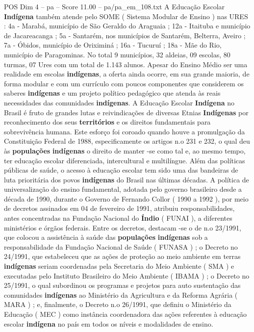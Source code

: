 \begin{textsample}{POS Dim 4 – pa – Score 11.00 – pa/pa\_em\_108.txt}
A Educação Escolar \textbf{Indígena} também atende pelo SOME ( Sistema Modular de Ensino ) nas URES : 4a - Marabá, município de São Geraldo do Araguaia ; 12a - Itaituba e município de Jacareacanga ; 5a - Santarém, nos municípios de Santarém, Belterra, Aveiro ; 7a - Óbidos, município de Oriximiná ; 16a - Tucuruí ; 18a - Mãe do Rio, município de Paragominas.
No total 9 municípios, 32 aldeias, 09 escolas, 80 turmas, 07 Ures com um total de 1.143 alunos.
Apesar do Ensino Médio ser uma realidade em escolas \textbf{indígenas}, a oferta ainda ocorre, em sua grande maioria, de forma modular e com um currículo com poucos componentes que considerem os saberes \textbf{indígenas} e um projeto político pedagógico que atenda às reais necessidades das comunidades \textbf{indígenas}.
A Educação Escolar \textbf{Indígena} no Brasil é fruto de grandes lutas e reivindicações de diversas Etnias \textbf{Indígenas} por reconhecimento dos seus \textbf{territórios} e os direitos fundamentais para sobrevivência humana.
Este esforço foi coroado quando houve a promulgação da Constituição Federal de 1988, especificamente os artigos n.o 231 e 232, o qual deu às \textbf{populações} \textbf{indígenas} o direito de manter -se como tal e, ao mesmo tempo, ter educação escolar diferenciada, intercultural e multilíngue.
Além das políticas públicas de saúde, o acesso à educação escolar tem sido uma das bandeiras de luta prioritária dos povos \textbf{indígenas} do Brasil nas últimas décadas.
A política de universalização do ensino fundamental, adotada pelo governo brasileiro desde a década de 1990, durante o Governo de Fernando Collor ( 1990 a 1992 ), por meio de decretos assinados em 04 de fevereiro de 1991, atribuiu responsabilidades, antes concentradas na Fundação Nacional do \textbf{Índio} ( FUNAI ), a diferentes ministérios e órgãos federais.
Entre os decretos, destacam -se o de n.o 23/1991, que colocou a assistência à saúde das \textbf{populações} \textbf{indígenas} sob a responsabilidade da Fundação Nacional de Saúde ( FUNASA ) ; o Decreto no 24/1991, que estabeleceu que as ações de proteção ao meio ambiente em terras \textbf{indígenas} seriam coordenadas pela Secretaria do Meio Ambiente ( SMA ) e executadas pelo Instituto Brasileiro do Meio Ambiente ( IBAMA ) ; o Decreto no 25/1991, o qual subordinou os programas e projetos para auto sustentação das comunidades \textbf{indígenas} ao Ministério da Agricultura e da Reforma Agrária ( MARA ) ; e, finalmente, o Decreto n.o 26/1991, que definiu o Ministério da Educação ( MEC ) como instância coordenadora das ações referentes à educação escolar \textbf{indígena} no país em todos os níveis e modalidades de ensino.

\end{textsample}
